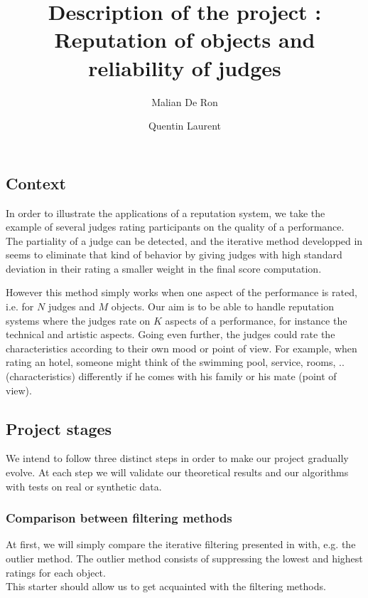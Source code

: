 \documentclass[12pt,a4paper,notitlepage]{article}
\title{Description of the project : Reputation of objects and reliability of judges}
\author{Malian De Ron \and Quentin Laurent}
\begin{document}
\maketitle

\subsection*{Context}
In order to illustrate the applications of a reputation system, we take the example of several judges rating participants on the quality of a performance. The partiality of a judge can be detected, and the iterative method developped in \cite{Cristo1} seems to eliminate that kind of behavior by giving judges with high standard deviation in their rating a smaller weight in the final score computation.

However this method simply works when one aspect of the performance is rated, i.e. for $N$ judges and $M$ objects. Our aim is to be able to handle reputation systems where the judges rate on $K$ aspects of a performance, for instance the technical and artistic aspects. 
Going even further, the judges could rate the characteristics according to their own mood or point of view. For example, when rating an hotel, someone might think of the swimming pool, service, rooms, .. (characteristics) differently if he comes with his family or his mate (point of view).

\subsection*{Project stages}
We intend to follow three distinct steps in order to make our project gradually evolve. At each step we will validate our theoretical results and our algorithms with tests on real or synthetic data.

\subsubsection*{Comparison between filtering methods}
At first, we will simply compare the iterative filtering presented in \cite{Cristo1} 
 with, e.g. the outlier method. The outlier method consists of suppressing the lowest and highest ratings for each object.\\
 This starter should allow us to get acquainted with the filtering methods.
\end{document}
